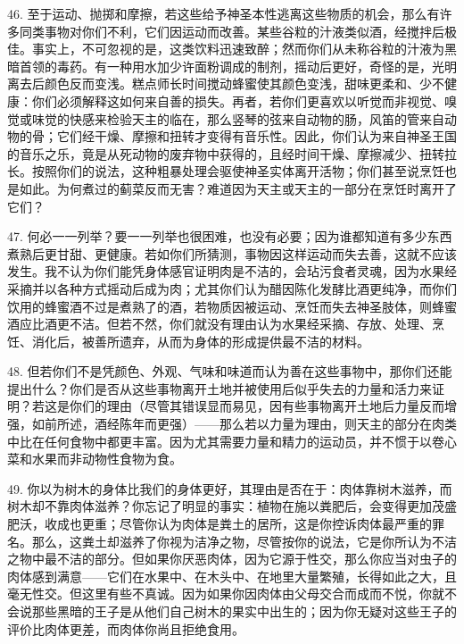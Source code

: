 46. 至于运动、抛掷和摩擦，若这些给予神圣本性逃离这些物质的机会，那么有许多同类事物对你们不利，它们因运动而改善。某些谷粒的汁液类似酒，经搅拌后极佳。事实上，不可忽视的是，这类饮料迅速致醉；然而你们从未称谷粒的汁液为黑暗首领的毒药。有一种用水加少许面粉调成的制剂，摇动后更好，奇怪的是，光明离去后颜色反而变浅。糕点师长时间搅动蜂蜜使其颜色变浅，甜味更柔和、少不健康：你们必须解释这如何来自善的损失。再者，若你们更喜欢以听觉而非视觉、嗅觉或味觉的快感来检验天主的临在，那么竖琴的弦来自动物的肠，风笛的管来自动物的骨；它们经干燥、摩擦和扭转才变得有音乐性。因此，你们认为来自神圣王国的音乐之乐，竟是从死动物的废弃物中获得的，且经时间干燥、摩擦减少、扭转拉长。按照你们的说法，这种粗暴处理会驱使神圣实体离开活物；你们甚至说烹饪也是如此。为何煮过的蓟菜反而无害？难道因为天主或天主的一部分在烹饪时离开了它们？\par

47. 何必一一列举？要一一列举也很困难，也没有必要；因为谁都知道有多少东西煮熟后更甘甜、更健康。若如你们所猜测，事物因这样运动而失去善，这就不应该发生。我不认为你们能凭身体感官证明肉是不洁的，会玷污食者灵魂，因为水果经采摘并以各种方式摇动后成为肉；尤其你们认为醋因陈化发酵比酒更纯净，而你们饮用的蜂蜜酒不过是煮熟了的酒，若物质因被运动、烹饪而失去神圣肢体，则蜂蜜酒应比酒更不洁。但若不然，你们就没有理由认为水果经采摘、存放、处理、烹饪、消化后，被善所遗弃，从而为身体的形成提供最不洁的材料。\par

48. 但若你们不是凭颜色、外观、气味和味道而认为善在这些事物中，那你们还能提出什么？你们是否从这些事物离开土地并被使用后似乎失去的力量和活力来证明？若这是你们的理由（尽管其错误显而易见，因有些事物离开土地后力量反而增强，如前所述，酒经陈年而更强）——那么若以力量为理由，则天主的部分在肉类中比在任何食物中都更丰富。因为尤其需要力量和精力的运动员，并不惯于以卷心菜和水果而非动物性食物为食。\par

49. 你以为树木的身体比我们的身体更好，其理由是否在于：肉体靠树木滋养，而树木却不靠肉体滋养？你忘记了明显的事实：植物在施以粪肥后，会变得更加茂盛肥沃，收成也更重；尽管你认为肉体是粪土的居所，这是你控诉肉体最严重的罪名。那么，这粪土却滋养了你视为洁净之物，尽管按你的说法，它是你所认为不洁之物中最不洁的部分。但如果你厌恶肉体，因为它源于性交，那么你应当对虫子的肉体感到满意——它们在水果中、在木头中、在地里大量繁殖，长得如此之大，且毫无性交。但这里有些不真诚。因为如果你因肉体由父母交合而成而不悦，你就不会说那些黑暗的王子是从他们自己树木的果实中出生的；因为你无疑对这些王子的评价比肉体更差，而肉体你尚且拒绝食用。\par

